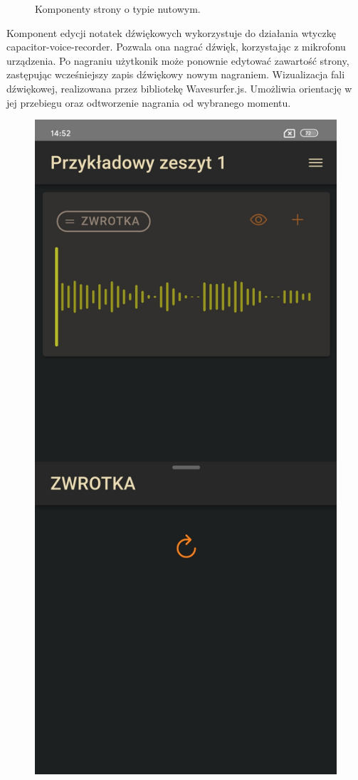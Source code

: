 \begin{figure}[H]
\begin{center}
	\end{center}
	\caption{Komponenty strony o typie nutowym.}
	\label{rys:score-page}
\end{figure}

Komponent edycji notatek dźwiękowych wykorzystuje do działania wtyczkę capacitor-voice-recorder. Pozwala ona nagrać
dźwięk, korzystając z mikrofonu urządzenia. Po nagraniu użytkonik może ponownie edytować zawartość strony, zastępując
wcześniejszy zapis dźwiękowy nowym nagraniem. Wizualizacja fali dźwiękowej, realizowana przez bibliotekę Wavesurfer.js.
Umożliwia orientację w jej przebiegu oraz odtworzenie nagrania od wybranego momentu.
\begin{figure}[H]
	\begin{center}
		\includegraphics[scale=0.2]{media/AudioPage.jpg}

\end{center}
\end{figure}

